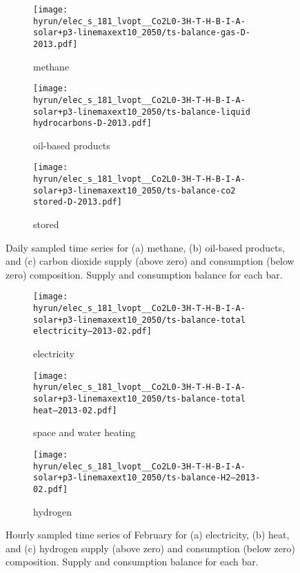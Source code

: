\begin{figure}
    \centering

    \begin{subfigure}[t]{\textwidth}
        \centering
        \caption{methane}
        \texttt{[image: \\hyrun/elec\_s\_181\_lvopt\_\_Co2L0-3H-T-H-B-I-A-solar+p3-linemaxext10\_2050/ts-balance-gas-D-2013.pdf]}
    \end{subfigure}
    \begin{subfigure}[t]{\textwidth}
        \centering
        \caption{oil-based products}
        \texttt{[image: \\hyrun/elec\_s\_181\_lvopt\_\_Co2L0-3H-T-H-B-I-A-solar+p3-linemaxext10\_2050/ts-balance-liquid hydrocarbons-D-2013.pdf]}
    \end{subfigure}
    \begin{subfigure}[t]{\textwidth}
        \centering
        \caption{stored \co}
        \texttt{[image: \\hyrun/elec\_s\_181\_lvopt\_\_Co2L0-3H-T-H-B-I-A-solar+p3-linemaxext10\_2050/ts-balance-co2 stored-D-2013.pdf]}
    \end{subfigure}

    \caption{Daily sampled time series for (a) methane, (b) oil-based products, and (c) carbon dioxide supply (above zero) and consumption (below zero) composition. Supply and consumption balance for each bar.}
    \label{fig:output-ts-2}
\end{figure}


\begin{figure}
    \centering

    \begin{subfigure}[t]{\textwidth}
        \centering
        \caption{electricity}
        \texttt{[image: \\hyrun/elec\_s\_181\_lvopt\_\_Co2L0-3H-T-H-B-I-A-solar+p3-linemaxext10\_2050/ts-balance-total electricity--2013-02.pdf]}
    \end{subfigure}
    \begin{subfigure}[t]{\textwidth}
        \centering
        \caption{space and water heating}
        \texttt{[image: \\hyrun/elec\_s\_181\_lvopt\_\_Co2L0-3H-T-H-B-I-A-solar+p3-linemaxext10\_2050/ts-balance-total heat--2013-02.pdf]}
    \end{subfigure}
    \begin{subfigure}[t]{\textwidth}
        \centering
        \caption{hydrogen}
        \texttt{[image: \\hyrun/elec\_s\_181\_lvopt\_\_Co2L0-3H-T-H-B-I-A-solar+p3-linemaxext10\_2050/ts-balance-H2--2013-02.pdf]}
    \end{subfigure}

    \caption{Hourly sampled time series of February for (a) electricity, (b) heat, and (c) hydrogen supply (above zero) and consumption (below zero) composition. Supply and consumption balance for each bar.}
    \label{fig:output-ts-3}
\end{figure}

